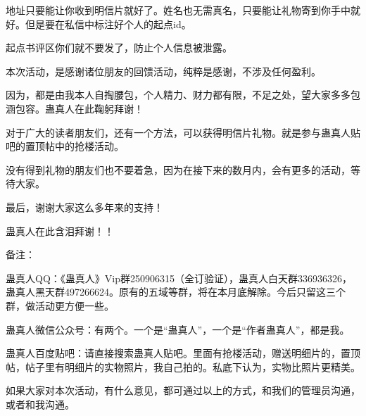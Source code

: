 \begin{this_body}
地址只要能让你收到明信片就好了。姓名也无需真名，只要能让礼物寄到你手中就好。但是要在私信中标注好个人的起点id。

起点书评区你们就不要发了，防止个人信息被泄露。

本次活动，是感谢诸位朋友的回馈活动，纯粹是感谢，不涉及任何盈利。

因为，都是由我本人自掏腰包，个人精力、财力都有限，不足之处，望大家多多包涵包容。蛊真人在此鞠躬拜谢！

对于广大的读者朋友们，还有一个方法，可以获得明信片礼物。就是参与蛊真人贴吧的置顶帖中的抢楼活动。

没有得到礼物的朋友们也不要着急，因为在接下来的数月内，会有更多的活动，等待大家。

最后，谢谢大家这么多年来的支持！

蛊真人在此含泪拜谢！！

备注：

蛊真人QQ：《蛊真人》Vip群250906315（全订验证），蛊真人白天群336936326，蛊真人黑天群497266624。原有的五域等群，将在本月底解除。今后只留这三个群，做活动更方便一些。

蛊真人微信公众号：有两个。一个是“蛊真人”，一个是“作者蛊真人”，都是我。

蛊真人百度贴吧：请直接搜索蛊真人贴吧。里面有抢楼活动，赠送明细片的，置顶帖，帖子里有明细片的实物照片，我自己拍的。私底下认为，实物比照片更精美。

如果大家对本次活动，有什么意见，都可通过以上的方式，和我们的管理员沟通，或者和我沟通。

\end{this_body}


